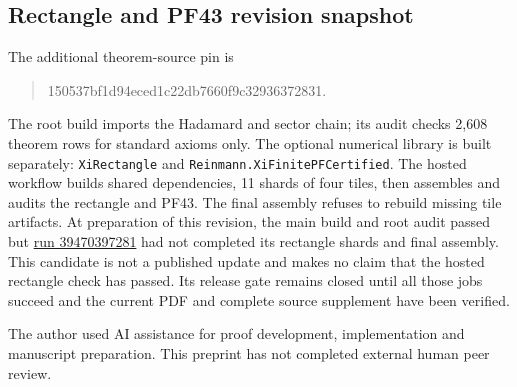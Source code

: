 \documentclass[11pt]{amsart}
\begin{document}
\subsection*{Rectangle and PF43 revision snapshot}
The additional theorem-source pin is
\begin{quote}\small\ttfamily
150537bf1d94eced1c22db7660f9c32936372831.
\end{quote}
The root build imports the Hadamard and sector chain; its audit checks
2,608 theorem rows for standard axioms only. The optional numerical library is
built separately: \texttt{XiRectangle} and
\texttt{Reinmann.XiFinitePFCertified}. The hosted workflow builds shared
dependencies, 11 shards of four tiles, then assembles and audits the rectangle
and PF43. The final assembly refuses to rebuild missing tile artifacts.
At preparation of this revision, the main build and root audit passed but
\href{https://github.com/sciencenerd-des/reinmann/actions/runs/39470397281}{run 39470397281}
had not completed its rectangle shards and final assembly. This candidate is
not a published update and makes no claim that the hosted rectangle check
has passed. Its release gate remains closed until all those jobs succeed and
the current PDF and complete source supplement have been verified.

The author used AI assistance for proof development, implementation and manuscript
preparation. This preprint has not completed external human peer review.
\end{document}
